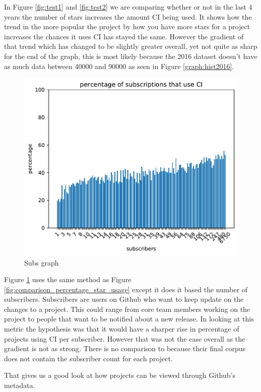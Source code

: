 \documentclass[10pt,conference]{IEEEtran}
\begin{document}
In Figure \ref{fig:test1} and \ref{fig:test2} we are comparing whether or not in the last 4 years the number of stars increases the amount CI being used. It shows how the trend in the more popular the project by how you have more stars for a project increases the chances it uses CI has stayed the same. However the gradient of that trend which has changed to be slightly greater overall, yet not quite as sharp for the end of the graph, this is most likely because the 2016 dataset doesn't have as much data between 40000 and 90000 as seen in Figure \ref{graph:hist2016}.

\begin{figure}[!h]
  \centering
  \includegraphics[width=.8\textwidth]{../src/results/percentage sub with CI.pdf}
  \caption{Subs graph}
  \label{graph_percentage_subs}
\end{figure}
Figure \ref{graph_percentage_subs} uses the same method as Figure \ref{fig:comparison_percentage_star_usage} except it does it based the number of subscribers. Subscribers are users on Github who want to keep update on the changes to a project. This could range from core team members working on the project to people that want to be notified about a new release. 
In looking at this metric the hypothesis was that it would have a sharper rise in percentage of projects using CI per subscriber. However that was not the case overall as the gradient is not as strong. There is no comparison to \cite{Hilton2016} because their final corpus does not contain the subscriber count for each project.

That gives us a good look at how projects can be viewed through Github's metadata. 
\end{document}
